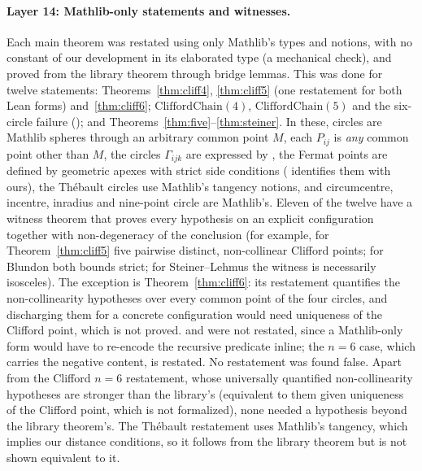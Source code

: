 \documentclass[11pt]{article}
\theoremstyle{definition}
\theoremstyle{remark}
\begin{document}
\paragraph{Layer 14: Mathlib-only statements and witnesses.} Each main theorem was restated using only
Mathlib's types and notions, with no constant of our development in its elaborated type (a mechanical
check), and proved from the library theorem through bridge lemmas. This was done for twelve statements:
Theorems~\ref{thm:cliff4}, \ref{thm:cliff5} (one restatement for both Lean forms) and~\ref{thm:cliff6};
$\mathrm{CliffordChain}(4)$, $\mathrm{CliffordChain}(5)$ and the six-circle failure
(); and Theorems~\ref{thm:five}--\ref{thm:steiner}. In these, circles
are Mathlib spheres through an arbitrary common point $M$, each $P_{ij}$ is \emph{any} common point other
than $M$, the circles $\Gamma_{ijk}$ are expressed by , the Fermat points are defined by
geometric apexes with strict side conditions ( identifies them with ours), the
Th\'ebault circles use Mathlib's tangency notions, and circumcentre, incentre, inradius and nine-point
circle are Mathlib's. Eleven of the twelve have a witness theorem that proves every hypothesis on an
explicit configuration together with non-degeneracy of the conclusion (for example, for
Theorem~\ref{thm:cliff5} five pairwise distinct, non-collinear Clifford points; for Blundon both bounds
strict; for Steiner--Lehmus the witness is necessarily isosceles). The exception is
Theorem~\ref{thm:cliff6}: its restatement quantifies the non-collinearity hypotheses over every common
point of the four circles, and discharging them for a concrete configuration would need uniqueness of the
Clifford point, which is not proved.  and
 were not restated, since a Mathlib-only form would have to re-encode the
recursive predicate inline; the $n=6$ case, which carries the negative content, is restated. No
restatement was found false. Apart from the Clifford $n=6$ restatement, whose universally quantified
non-collinearity hypotheses are stronger than the library's (equivalent to them given uniqueness of the
Clifford point, which is not formalized), none needed a hypothesis beyond the library theorem's. The Th\'ebault restatement uses Mathlib's
tangency, which implies our distance conditions, so it follows from the library theorem but is not shown
equivalent to it.
\end{document}
